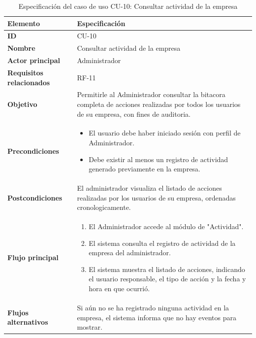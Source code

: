\begin{table}[H]
\centering
\caption{Especificación del caso de uso CU-10: Consultar actividad de la empresa}
\label{tab:cu10_consultar_actividad}
\renewcommand{\arraystretch}{1.3}
\begin{tabularx}{\textwidth}{|>{\bfseries}p{3.5cm}|X|}
\hline
Elemento & Especificación \\
\hline
ID & CU-10 \\
\hline
Nombre & Consultar actividad de la empresa \\
\hline
Actor principal & Administrador \\
\hline
Requisitos relacionados & RF-11 \\
\hline
Objetivo & Permitirle al Administrador consultar la bitacora completa de acciones realizadas por todos los usuarios de su empresa, con fines de auditoria. \\
\hline
Precondiciones &
\begin{itemize}
    \item El usuario debe haber iniciado sesión con perfil de Administrador.
    \item Debe existir al menos un registro de actividad generado previamente en la empresa.
\end{itemize} \\
\hline
Postcondiciones & El administrador visualiza el listado de acciones realizadas por los usuarios de su empresa, ordenadas cronologicamente. \\
\hline
Flujo principal &
\begin{enumerate}
    \item El Administrador accede al módulo de "Actividad".
    \item El sistema consulta el registro de actividad de la empresa del administrador.
    \item El sistema muestra el listado de acciones, indicando el usuario responsable, el tipo de acción y la fecha y hora en que ocurrió.
\end{enumerate} \\
\hline
Flujos alternativos & Si aún no se ha registrado ninguna actividad en la empresa, el sistema informa que no hay eventos para mostrar. \\
\hline
\end{tabularx}
\end{table}


